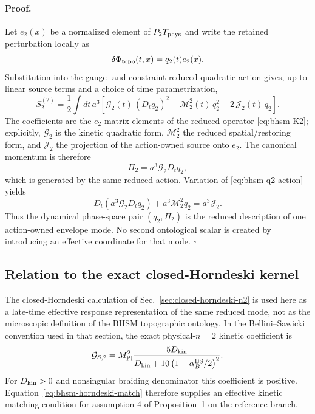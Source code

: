 \paragraph{Proof.}
Let $e_2(x)$ be a normalized element of
$P_2T_{\rm phys}$ and write the retained perturbation locally as
\begin{equation}
\delta\Phi_{\rm topo}(t,x)=q_2(t)e_2(x).
\end{equation}
Substitution into the gauge- and constraint-reduced quadratic action gives,
up to linear source terms and a choice of time parametrization,
\begin{equation}
S^{(2)}_2
=
\frac12
\int dt\,a^3
\left[
\mathcal G_2(t)\,
(D_t q_2)^2
-
\mathcal M_2^2(t)\,q_2^2
+
2\,\mathcal J_2(t)\,q_2
\right].
\label{eq:bhsm-q2-action}
\end{equation}
The coefficients are the $e_2$ matrix elements of the reduced operator
\eqref{eq:bhsm-K2}; explicitly,
$\mathcal G_2$ is the kinetic quadratic form,
$\mathcal M_2^2$ the reduced spatial/restoring form, and
$\mathcal J_2$ the projection of the action-owned source onto $e_2$.
The canonical momentum is therefore
\begin{equation}
\Pi_2
=
a^3\mathcal G_2 D_tq_2 ,
\end{equation}
which is generated by the same reduced action.  Variation of
\eqref{eq:bhsm-q2-action} yields
\begin{equation}
D_t\!\left(a^3\mathcal G_2D_tq_2\right)
+
a^3\mathcal M_2^2 q_2
=
a^3\mathcal J_2 .
\label{eq:bhsm-q2-eom}
\end{equation}
Thus the dynamical phase-space pair $(q_2,\Pi_2)$ is the reduced description
of one action-owned envelope mode.  No second ontological scalar is created
by introducing an effective coordinate for that mode. \hfill$\square$

\subsection{Relation to the exact closed-Horndeski kernel}

The closed-Horndeski calculation of
Sec.~\ref{sec:closed-horndeski-n2} is used here as a late-time effective
response representation of the same reduced mode, not as the microscopic
definition of the BHSM topographic ontology.  In the Bellini--Sawicki
convention used in that section, the exact physical-$n=2$ kinetic coefficient
is
\begin{equation}
\mathcal G_{S,2}
=
M_{\rm Pl}^2
\frac{
5D_{\rm kin}
}{
D_{\rm kin}
+
10\left(1-\alpha_B^{\rm BS}/2\right)^2
}.
\label{eq:bhsm-horndeski-match}
\end{equation}
For $D_{\rm kin}>0$ and nonsingular braiding denominator this coefficient is
positive.  Equation~\eqref{eq:bhsm-horndeski-match} therefore supplies an
effective kinetic matching condition for assumption 4 of Proposition~1 on the
reference branch.

